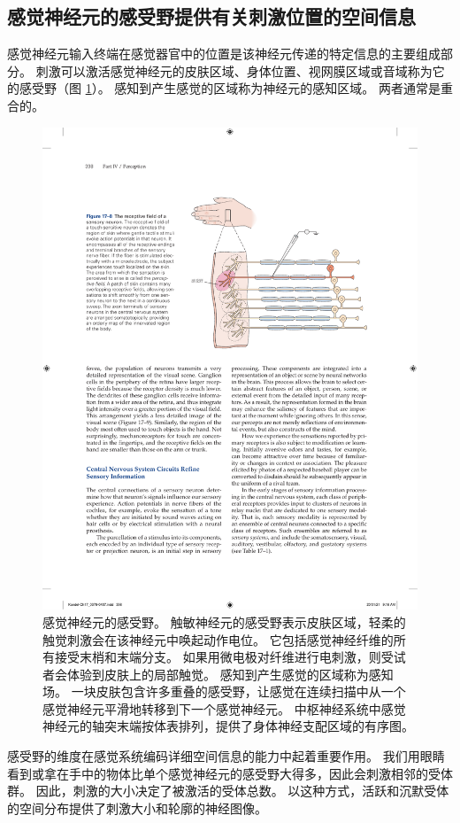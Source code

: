 \subsection{感觉神经元的感受野提供有关刺激位置的空间信息}

感觉神经元输入终端在感觉器官中的位置是该神经元传递的特定信息的主要组成部分。 
刺激可以激活感觉神经元的皮肤区域、身体位置、视网膜区域或音域称为它的感受野（图 \ref{fig:17_8}）。 
感知到产生感觉的区域称为神经元的感知区域。 
两者通常是重合的。

\begin{figure}[htbp]
	\centering
	\includegraphics[width=0.7\linewidth]{chap17/fig_17_8}
	\caption{感觉神经元的感受野。 
		触敏神经元的感受野表示皮肤区域，轻柔的触觉刺激会在该神经元中唤起动作电位。
		它包括感觉神经纤维的所有接受末梢和末端分支。 
		如果用微电极对纤维进行电刺激，则受试者会体验到皮肤上的局部触觉。 
		感知到产生感觉的区域称为感知场。 
		一块皮肤包含许多重叠的感受野，让感觉在连续扫描中从一个感觉神经元平滑地转移到下一个感觉神经元。 
		中枢神经系统中感觉神经元的轴突末端按体表排列，提供了身体神经支配区域的有序图。}
	\label{fig:17_8}
\end{figure}

感受野的维度在感觉系统编码详细空间信息的能力中起着重要作用。 
我们用眼睛看到或拿在手中的物体比单个感觉神经元的感受野大得多，因此会刺激相邻的受体群。 
因此，刺激的大小决定了被激活的受体总数。 
以这种方式，活跃和沉默受体的空间分布提供了刺激大小和轮廓的神经图像。


